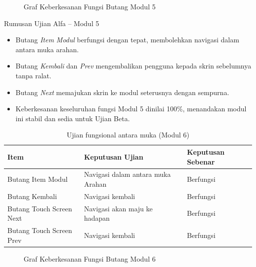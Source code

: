 {{\begin{figure}[h]
\centering
{}
\caption{Graf Keberkesanan Fungsi Butang Modul 5}
\label{rajah-5-6}
\end{figure}

 Rumusan Ujian Alfa – Modul 5

\begin{itemize}[h]
  \item Butang \textit{Item Modul} berfungsi dengan tepat, membolehkan navigasi dalam antara muka arahan.  
  \item Butang \textit{Kembali} dan \textit{Prev} mengembalikan pengguna kepada skrin sebelumnya tanpa ralat.  
  \item Butang \textit{Next} memajukan skrin ke modul seterusnya dengan sempurna.  
  \item Keberkesanan keseluruhan fungsi Modul 5 dinilai 100\%, menandakan modul ini stabil dan sedia untuk Ujian Beta.
\end{itemize}
\clearpage

\begin{table}[h]
\centering
\caption{Ujian fungsional antara muka (Modul 6)}
\label{jadual-5-7}
\begin{tabular}{lll}
\toprule
\textbf{Item} & \textbf{Keputusan Ujian} & \textbf{Keputusan Sebenar} \\ \midrule
Butang Item Modul & Navigasi dalam antara muka Arahan & Berfungsi \\ 
Butang Kembali & Navigasi kembali & Berfungsi \\ 
Butang Touch Screen Next & Navigasi akan maju ke hadapan & Berfungsi \\ 
Butang Touch Screen Prev & Navigasi kembali & Berfungsi \\ \bottomrule
\end{tabular}
\end{table}

\begin{figure}[h]
\centering
{}
\caption{Graf Keberkesanan Fungsi Butang Modul 6}
\label{rajah-5-7}
\end{figure}

}}
